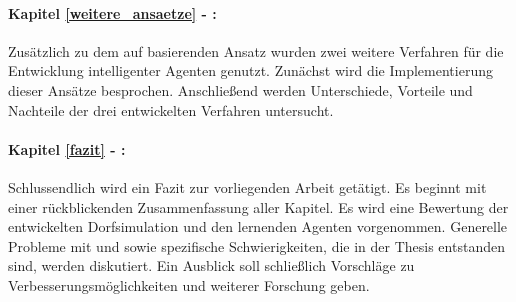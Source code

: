 \paragraph{Kapitel \ref{weitere_ansaetze} - :}
Zusätzlich zu dem auf  basierenden Ansatz wurden zwei weitere Verfahren für die Entwicklung intelligenter Agenten genutzt. Zunächst wird die Implementierung dieser Ansätze besprochen. Anschließend werden Unterschiede, Vorteile und Nachteile der drei entwickelten Verfahren untersucht.


\paragraph{Kapitel \ref{fazit} - :}
Schlussendlich wird ein Fazit zur vorliegenden Arbeit getätigt. Es beginnt mit einer rückblickenden Zusammenfassung aller Kapitel. Es wird eine Bewertung der entwickelten Dorfsimulation und den lernenden Agenten vorgenommen. Generelle Probleme mit  und  sowie spezifische Schwierigkeiten, die in der Thesis entstanden sind, werden diskutiert. Ein Ausblick soll schließlich Vorschläge zu Verbesserungsmöglichkeiten und weiterer Forschung geben. 

